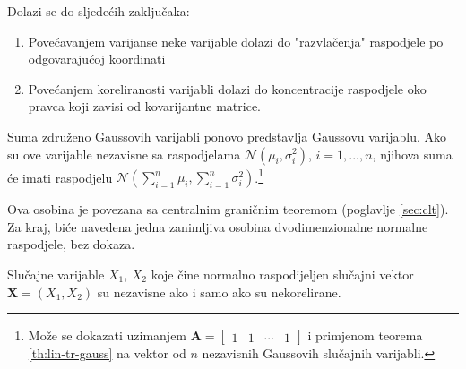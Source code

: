 \noindent
Dolazi se do sljedećih zaključaka:
\begin{enumerate}
	\item Povećavanjem varijanse neke varijable dolazi do "razvlačenja" raspodjele
		po odgovarajućoj koordinati
	\item Povećanjem koreliranosti varijabli dolazi do koncentracije raspodjele
		oko pravca koji zavisi od kovarijantne matrice.
\end{enumerate}

\begin{corollary}
  Suma združeno Gaussovih varijabli ponovo predstavlja Gaussovu
  varijablu. Ako su ove varijable nezavisne sa raspodjelama $\mathcal{N}(\mu_i,
  \sigma_i^2)$, $i=1,...,n$, njihova suma će imati raspodjelu
  $\mathcal{N}(\sum_{i=1}^{n}\mu_i, \sum_{i=1}^{n}\sigma_i^2)$.\footnote{
    Može se dokazati uzimanjem $\bm A = \left[
        \begin{array}{cccc}
          1 & 1 & \cdots & 1
        \end{array}\right]$
    i primjenom teorema \ref{th:lin-tr-gauss} na vektor od $n$ nezavisnih
    Gaussovih slučajnih varijabli.
  }
\end{corollary}

Ova osobina je povezana sa centralnim graničnim teoremom (poglavlje
\ref{sec:clt}). Za kraj, biće navedena jedna zanimljiva osobina
dvodimenzionalne normalne raspodjele, bez dokaza.

\begin{theorem}

  Slučajne varijable $X_1$, $X_2$ koje čine normalno raspodijeljen slučajni
  vektor $\bm X = (X_1, X_2)$ su nezavisne ako i samo ako su nekorelirane.

\end{theorem}

